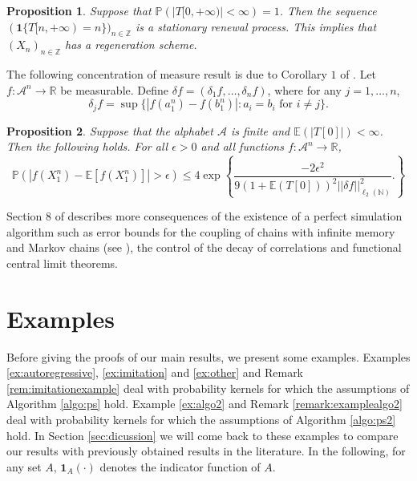 \documentclass[a4paper]{article}
\newtheorem{proposition}{Proposition}%
\def\P{{\mathbb P}}
\newcommand{\E}{\mathbb{E}}
\newcommand{\R}{\mathbb{R}}
\newcommand{\Z}{\mathbb{Z}}
\newcommand{\A}{\mathcal{A}}
\begin{document}
\begin{proposition} \label{prop:consequences2}
Suppose that $\P(|T[0,+\infty)|<\infty)=1$. Then the sequence $(\mathbf{1}\{T[n,+\infty)=n\})_{n\in \Z}$ is a stationary renewal process. This implies that $(X_n)_{n\in \Z}$ has a regeneration scheme.
\end{proposition}


The following concentration of measure result is due to Corollary $1$ of \cite{gallotakahashi}. Let $f:\A^n \to \R$ be measurable. Define $\delta f=(\delta_1 f, \ldots, \delta_n f)$, where for any $j=1,\ldots, n$,
$$
\delta_jf=\sup\{|f(a_{1}^n)-f(b_{1}^n)|:a_i=b_i \text{ for } i\neq j\}.
$$

\begin{proposition} \label{prop:gallotakahashi}
Suppose that the alphabet $\A$ is finite and $\E(|T[0]|)<\infty$. Then the following holds.
For all $\epsilon>0$ and all functions $f:\A^n \to \R$,
$$
\P(|f(X_1^n)-\E[f(X_1^n)]|>\epsilon)\leq 4 \exp\left\{\frac{-2\epsilon^2}{9(1+\E(T[0]))^2||\delta f||^2_{\ell_2(\mathbb{N})}}.
\right\}
$$
\end{proposition}

Section 8 of \cite{gallogarcia} describes more consequences of the existence of a perfect simulation algorithm such as error bounds for the coupling of chains with infinite memory and Markov chains (see \cite{gallotakahashi2}), the control of the decay of correlations and functional central limit theorems. 

\section{Examples} \label{sec:examples}

Before giving the proofs of our main results, we present some examples. Examples \ref{ex:autoregressive},  \ref{ex:imitation} and \ref{ex:other} and Remark \ref{rem:imitationexample} deal with probability kernels for which the assumptions of Algorithm \ref{algo:ps} hold. Example \ref{ex:algo2}  and Remark \ref{remark:examplealgo2} deal with probability kernels for which the assumptions of Algorithm \ref{algo:ps2} hold. %
In Section \ref{sec:dicussion} we will come back to these examples to compare our results with previously obtained results in the literature. In the following, for any set $A$, $\mathbf{1}_A(\cdot)$ denotes the indicator function of $A$.
\end{document}
